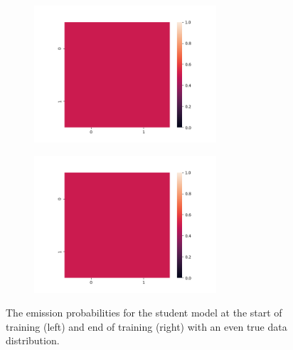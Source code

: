 \documentclass[11pt]{article}
\begin{document}
\begin{figure}[h]
\centering
\begin{subfigure}[t]{0.45\textwidth}
\centering
\includegraphics[height=2in]{../plots/even_prior_student_init.png}
\end{subfigure}
\begin{subfigure}[t]{0.45\textwidth}
\centering
\includegraphics[height=2in]{../plots/even_prior_student_final.png}
\end{subfigure}
\caption{
\label{fig:student-toy2}
The emission probabilities for the student model at the start of training (left)
and end of training (right) with an even true data distribution.
}
\end{figure}



\end{document}
